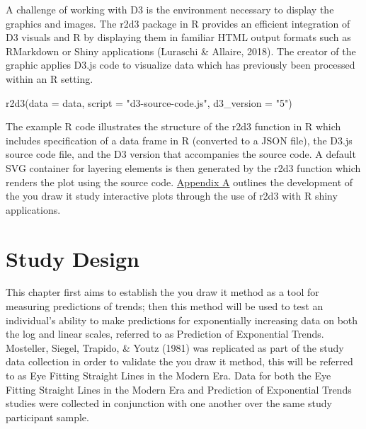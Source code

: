 \documentclass[print]{nuthesis}
\newenvironment{Shaded}{\begin{snugshade}}{\end{snugshade}}
\newcommand{\AttributeTok}[1]{\textcolor[rgb]{0.77,0.63,0.00}{#1}}
\newcommand{\FunctionTok}[1]{\textcolor[rgb]{0.00,0.00,0.00}{#1}}
\newcommand{\NormalTok}[1]{#1}
\newcommand{\StringTok}[1]{\textcolor[rgb]{0.31,0.60,0.02}{#1}}
\begin{document}
A challenge of working with D3 is the environment necessary to display the graphics and images.
The r2d3 package in R provides an efficient integration of D3 visuals and R by displaying them in familiar HTML output formats such as RMarkdown or Shiny applications (Luraschi \& Allaire, 2018).
The creator of the graphic applies D3.js code to visualize data which has previously been processed within an R setting.

\begin{Shaded}
\begin{Highlighting}[]
\FunctionTok{r2d3}\NormalTok{(}\AttributeTok{data =}\NormalTok{ data, }\AttributeTok{script =} \StringTok{"d3{-}source{-}code.js"}\NormalTok{, }
    \AttributeTok{d3\_version =} \StringTok{"5"}\NormalTok{)}
\end{Highlighting}
\end{Shaded}

The example R code illustrates the structure of the r2d3 function in R which includes specification of a data frame in R (converted to a JSON file), the D3.js source code file, and the D3 version that accompanies the source code.
A default SVG container for layering elements is then generated by the r2d3 function which renders the plot using the source code.
\protect\hyperlink{youdrawit-with-shiny}{Appendix A} outlines the development of the you draw it study interactive plots through the use of r2d3 with R shiny applications.

\hypertarget{study-design-1}{%
\section{Study Design}\label{study-design-1}}

This chapter first aims to establish the you draw it method as a tool for measuring predictions of trends; then this method will be used to test an individual's ability to make predictions for exponentially increasing data on both the log and linear scales, referred to as Prediction of Exponential Trends.
Mosteller, Siegel, Trapido, \& Youtz (1981) was replicated as part of the study data collection in order to validate the you draw it method, this will be referred to as Eye Fitting Straight Lines in the Modern Era.
Data for both the Eye Fitting Straight Lines in the Modern Era and Prediction of Exponential Trends studies were collected in conjunction with one another over the same study participant sample.
\end{document}
